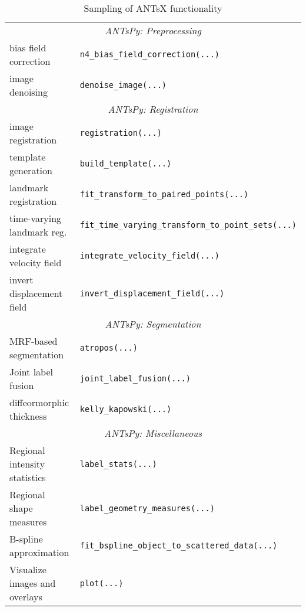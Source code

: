 
\begin{table}
  \small
   \centering
   \vspace{-0.25cm}
   \caption{Sampling of ANTsX functionality} 
   \begin{tabular*}{0.95\textwidth}{l @{\extracolsep{\fill}} p{}}
    \toprule
    \multicolumn{2}{c}{\cellcolor{gray!25} \em ANTsPy: Preprocessing} \\
    \cmidrule[1pt](lr){1-2}
    bias field correction & \texttt{n4\_bias\_field\_correction(...)} \\
    image denoising  & \texttt{denoise\_image(...)} \\
    \cmidrule[1pt](lr){1-2}
    \multicolumn{2}{c}{\cellcolor{gray!25} \em ANTsPy: Registration} \\
    \cmidrule[1pt](lr){1-2}
    image registration & \texttt{registration(...)} \\
    template generation  & \texttt{build\_template(...)} \\
    landmark registration & \texttt{fit\_transform\_to\_paired\_points(...)} \\
    time-varying landmark reg. & \texttt{fit\_time\_varying\_transform\_to\_point\_sets(...)} \\
    integrate velocity field & \texttt{integrate\_velocity\_field(...)} \\
    invert displacement field & \texttt{invert\_displacement\_field(...)} \\
    \cmidrule[1pt](lr){1-2}
    \multicolumn{2}{c}{\cellcolor{gray!25} \em ANTsPy: Segmentation} \\
    \cmidrule[1pt](lr){1-2}
    MRF-based segmentation & \texttt{atropos(...)} \\
    Joint label fusion & \texttt{joint\_label\_fusion(...)} \\
    diffeormorphic thickness   & \texttt{kelly\_kapowski(...)} \\
    \cmidrule[1pt](lr){1-2}
    \multicolumn{2}{c}{\cellcolor{gray!25} \em ANTsPy: Miscellaneous} \\
    \cmidrule[1pt](lr){1-2}
    Regional intensity statistics & \texttt{label\_stats(...)} \\
    Regional shape measures & \texttt{label\_geometry\_measures(...)} \\
    B-spline approximation & \texttt{fit\_bspline\_object\_to\_scattered\_data(...)} \\
    Visualize images and overlays\,\,\,\,\,\,\,\,\,\,\,\, & \texttt{plot(...)} \\

\end{tabular*}
\end{table}
